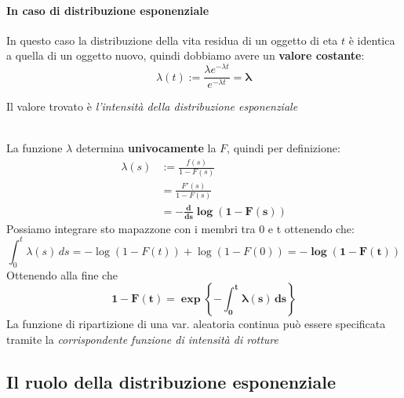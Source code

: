 \documentclass[]{article}
\begin{document}
    \paragraph{In caso di distribuzione esponenziale} In questo caso la distribuzione della vita residua di un oggetto di eta $t$ è identica a quella di un oggetto nuovo, quindi dobbiamo avere un \textbf{valore costante}:
    \[ \lambda(t) := \frac{\lambda e^{-\lambda t}}{e^{-\lambda t}} = \boldsymbol{\lambda} \]
    \centerline{Il valore trovato è \textit{l'intensità della distribuzione esponenziale}} \\[2ex]
    La funzione $\lambda$ determina \textbf{univocamente} la $F$, quindi per definizione:
    \begin{equation}
        \begin{split}
            \lambda(s) &:= \frac{f(s)}{1-F(s)} \\
            &= \frac{F'(s)}{1 - F(s)} \\
            &= \boldsymbol{- \frac{d}{ds} \log (1- F(s))}
        \end{split}
    \end{equation}
    Possiamo integrare sto mapazzone con i membri tra 0 e t ottenendo che:
    \[ \int_{0}^{t} \lambda(s) \, ds = - \log(1-F(t)) + \log (1-F(0)) = \boldsymbol{-\log (1-F(t))} \]
    Ottenendo alla fine che 
    \[ \boldsymbol{1 - F(t) = \exp \left\{ - \int_{0}^{t} \lambda(s) \, ds \right\}} \]
    La funzione di ripartizione di una var. aleatoria continua può essere specificata tramite la \textit{corrispondente funzione di intensità di rotture}
    \subsection{Il ruolo della distribuzione esponenziale}
\end{document}
